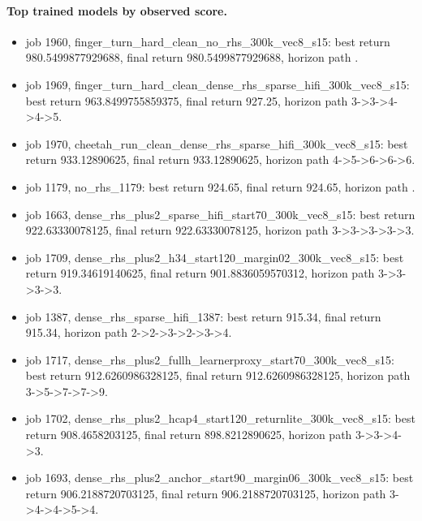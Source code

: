 \paragraph{Top trained models by observed score.}
\begin{itemize}
\item job 1960, finger\_turn\_hard\_clean\_no\_rhs\_300k\_vec8\_s15: best return 980.5499877929688, final return 980.5499877929688, horizon path .
\item job 1969, finger\_turn\_hard\_clean\_dense\_rhs\_sparse\_hifi\_300k\_vec8\_s15: best return 963.8499755859375, final return 927.25, horizon path 3->3->4->4->5.
\item job 1970, cheetah\_run\_clean\_dense\_rhs\_sparse\_hifi\_300k\_vec8\_s15: best return 933.12890625, final return 933.12890625, horizon path 4->5->6->6->6.
\item job 1179, no\_rhs\_1179: best return 924.65, final return 924.65, horizon path .
\item job 1663, dense\_rhs\_plus2\_sparse\_hifi\_start70\_300k\_vec8\_s15: best return 922.63330078125, final return 922.63330078125, horizon path 3->3->3->3->3.
\item job 1709, dense\_rhs\_plus2\_h34\_start120\_margin02\_300k\_vec8\_s15: best return 919.34619140625, final return 901.8836059570312, horizon path 3->3->3->3.
\item job 1387, dense\_rhs\_sparse\_hifi\_1387: best return 915.34, final return 915.34, horizon path 2->2->3->2->3->4.
\item job 1717, dense\_rhs\_plus2\_fullh\_learnerproxy\_start70\_300k\_vec8\_s15: best return 912.6260986328125, final return 912.6260986328125, horizon path 3->5->7->7->9.
\item job 1702, dense\_rhs\_plus2\_hcap4\_start120\_returnlite\_300k\_vec8\_s15: best return 908.4658203125, final return 898.8212890625, horizon path 3->3->4->3.
\item job 1693, dense\_rhs\_plus2\_anchor\_start90\_margin06\_300k\_vec8\_s15: best return 906.2188720703125, final return 906.2188720703125, horizon path 3->4->4->5->4.
\end{itemize}

